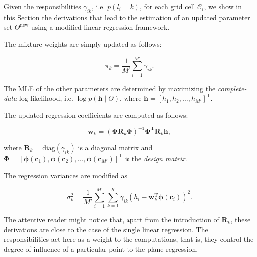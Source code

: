 Given the responsibilities $\gamma_{ik}$, i.e. $p(l_i=k)$, for each grid cell
$\mathcal{C}_i$, we show in this Section the derivations that lead to the
estimation of an updated parameter set $\Theta^\text{new}$ using a modified
linear regression framework.

The mixture weights are simply updated as follows:

\begin{equation}
\label{eqn:weights}
\pi_k = \frac{1}{M'}\sum_{i=1}^{M'}\gamma_{ik}.
\end{equation}

The MLE of the other parameters are determined by maximizing the
\emph{complete-data} log likelihood, i.e. $\log p(\mathbf{h}\mid\Theta)$, where
$\mathbf{h}=[h_1,h_2,\dots,h_{M'}]^\text{T}$.

The updated regression coefficients are computed as follows:

\begin{equation}
\label{eqn:coeff}
\mathbf{w}_k = (\boldsymbol{\Phi}\mathbf{R}_k\boldsymbol{\Phi})^{-1}
\boldsymbol{\Phi}^\text{T}\mathbf{R}_k\mathbf{h},
\end{equation}

where $\mathbf{R}_k=\text{diag}(\gamma_{ik})$ is a diagonal matrix and
$\boldsymbol{\Phi}=[\boldsymbol{\phi}(\mathbf{c}_1), \boldsymbol{\phi}
(\mathbf{c}_2),\dots,\boldsymbol{\phi}(\mathbf{c}_{M'})]^\text{T}$ is the
\emph{design matrix}.

The regression variances are modified as

\begin{equation}
\label{eqn:coeff}
\sigma^2_k = \frac{1}{M'}\sum_{i=1}^{M'}\sum_{k=1}^K \gamma_{ik}(h_i-
\mathbf{w}_k^\text{T}\boldsymbol{\phi}(\mathbf{c}_i))^2.
\end{equation}

The attentive reader might notice that, apart from the introduction of
$\mathbf{R}_k$, these derivations are close to the case of the single linear
regression. The responsibilities act here as a weight to the computations, that
is, they control the degree of influence of a particular point to the
plane regression.
